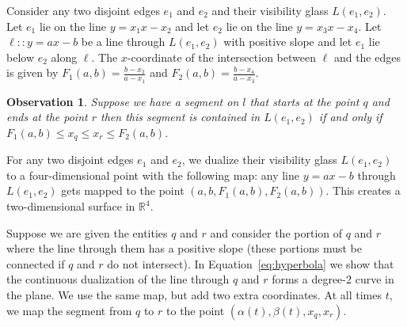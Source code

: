 \documentclass[UKenglish]{lipics-v2019}
\newtheorem{observation}{Observation}
\begin{document}
Consider any two disjoint edges $e_1$ and $e_2$ and their visibility glass $L(e_1, e_2)$. Let $e_1$ lie on the line $y = x_1 x - x_2$ and let $e_2$ lie on the line $y = x_3 x - x_4$. Let $\ell :: y = ax - b$ be a line through $L(e_1, e_2)$ with positive slope and let $e_1$ lie below $e_2$ along $\ell$. The $x$-coordinate of the intersection between $\ell$ and the edges is given by $F_1(a,b) = \frac{b-x_2}{a - x_1}$ and $F_2(a,b) = \frac{b - x_4}{a - x_3}$.

\begin{observation}
Suppose we have a segment on $l$ that starts at the point $q$ and ends at the point $r$ then this segment is contained in $L(e_1, e_2)$ if and only if $F_1(a,b) \le x_{q} \le x_{r} \le F_2(a,b)$.
\end{observation}

For any two disjoint edges $e_1$ and $e_2$, we dualize their visibility glass $L(e_1, e_2)$ to a four-dimensional point with the following map: any line $y = ax - b$ through $L(e_1, e_2)$ gets mapped to the point $(a, b, F_1(a,b), F_2(a,b))$. This creates a two-dimensional surface in $\mathbb{R}^4$.

Suppose we are given the  entities $q$ and $r$ and consider the portion of $q$ and $r$ where the line through them has a positive slope (these portions must be connected if $q$ and $r$ do not intersect). In Equation~\ref{eq:hyperbola} we show that the continuous dualization of the line through $q$ and $r$ forms a degree-2 curve in the plane. We use the same map, but add two extra coordinates. At all times $t$, we map the segment from $q$ to $r$ to the point $(\alpha(t), \beta(t), x_q, x_r)$. 





\end{document}
